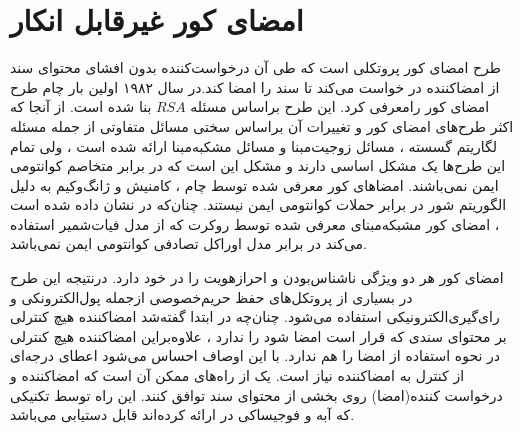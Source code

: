 \documentclass[12pt,a4paper]{article}
\date{}
\theoremstyle{plain}
\newtheorem{theorem}{قضیه}
\theoremstyle{definition}
\theoremstyle{remark}
\begin{document}


\section{امضای کور غیرقابل انکار}\label{undeniable_blind_sig}

طرح امضای کور پروتکلی است که طی آن درخواست‌کننده بدون افشای محتوای سند از امضاکننده در خواست می‌کند تا سند را امضا کند.در سال ۱۹۸۲ اولین بار چام طرح امضای کور رامعرفی کرد.
\cite{chaum@blind}
این طرح براساس مسئله 
$RSA$
بنا شده است.
\cite{rivest@rsa}
از آنجا که اکثر طرح‌های امضای کور و تغییرات آن براساس سختی مسائل متفاوتی از جمله مسئله لگاریتم گسسته
 ، مسائل زوجیت‌مبنا 
  و مسائل مشکبه‌مبنا
   ارائه شده است 
\cite{discrete@blind, lattice@blind, pairing@blind}
، ولی تمام این طرح‌ها یک مشکل اساسی دارند و مشکل این است که در برابر متخاصم کوانتومی ایمن نمی‌باشند. امضاهای کور معرفی شده توسط چام 
\cite{chaum@blind}
، کامنیش  
\cite{discrete@blind}
و ژانگ‌و‌کیم 
\cite{pairing@blind}
به دلیل الگوریتم شور 
 در برابر حملات کوانتومی ایمن نیستند.
چنان‌که در  
\cite{shamir@quantum}
نشان داده شده است ، امضای کور مشبکه‌مبنای معرفی شده توسط روکرت  
\cite{lattice@blind}
که از مدل فیات‌شمیر 
\cite{fiat@prove}
استفاده می‌کند در برابر مدل اوراکل تصادفی کوانتومی ایمن 
نمی‌باشد.

امضای کور هر دو ویژگی ناشناس‌بودن
 و احرازهویت 
 را در خود دارد.
\cite{untraceable, untraceability}
در‌نتیجه این طرح در بسیاری از پروتکل‌های حفظ حریم‌خصوصی 
ازجمله پول‌الکترونکی 
و رای‌گیری‌الکترونیکی
استفاده می‌شود.
\cite{e_vote@mobile, e_vot@net }
چنان‌چه در ابتدا گفته‌شد امضاکننده هیچ کنترلی بر محتوای سندی که قرار است امضا شود را ندارد ، علاوه‌بر‌این امضاکننده هیچ کنترلی در نحوه استفاده از امضا را هم ندارد. با این اوصاف احساس می‌شود اعطای درجه‌ای از کنترل به امضاکننده نیاز است. یک از راه‌های ممکن آن است که امضاکننده و درخواست کننده(امضا) روی بخشی از محتوای سند توافق کنند. این راه توسط تکنیکی که آبه و فوجیساکی در 
\cite{date@blind}
ارائه کرده‌اند قابل دستیابی می‌باشد.
\end{document}
